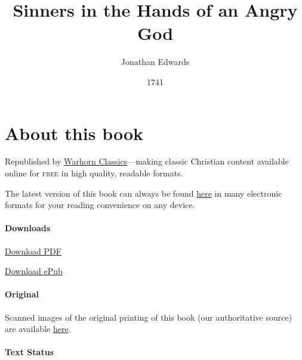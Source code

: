\documentclass[
]{book}
\title{Sinners in the Hands of an Angry God}
\author{Jonathan Edwards}
\date{1741}
\begin{document}
\maketitle

\mainmatter
{}

{
\setcounter{tocdepth}{1}
\tableofcontents
}
\hypertarget{about-this-book}{%
\chapter*{About this book}\label{about-this-book}}

Republished by \href{https://classics.warhornmedia.com/}{Warhorn Classics}---making classic Christian content available online for \textsc{free} in high quality, readable formats.

The latest version of this book can always be found \href{https://warhornmedia.github.io/edwards-sinners-angry-god/}{here} in many electronic formats for your reading convenience on any device.

\hypertarget{downloads}{%
\subsubsection*{Downloads}\label{downloads}}

\href{https://warhornmedia.github.io/edwards-sinners-angry-god//Edwards-Sinners_In_the-Hands_of_an_Angry_God.pdf}{Download PDF}

\href{https://warhornmedia.github.io/edwards-sinners-angry-god//Edwards-Sinners_In_the-Hands_of_an_Angry_God.epub}{Download ePub}

\hypertarget{original}{%
\subsubsection*{Original}\label{original}}

Scanned images of the original printing of this book (our authoritative source) are available \href{https://digitalcommons.unl.edu/cgi/viewcontent.cgi?referer=https://en.wikipedia.org/\&httpsredir=1\&article=1053\&context=etas}{here}.

\hypertarget{text-status}{%
\subsubsection*{Text Status}\label{text-status}}
\end{document}
